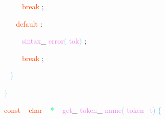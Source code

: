 \documentclass[8, usernames, dvipsnames]{beamer}
\begin{document}
\begin{frame}
\textcolor{White}{\   }
\textcolor{White}{\   }
\textcolor{White}{\   }
\textcolor{OrangeRed}{break}
\textcolor{Sepia}{;}

 \textcolor{White}{\   }
\textcolor{White}{\   }
\textcolor{OrangeRed}{default}
\textcolor{Sepia}{:}

 \textcolor{White}{\   }
\textcolor{White}{\   }
\textcolor{White}{\   }
\textcolor{Violet}{sintax}\textcolor{Sepia}{\_}
\textcolor{Violet}{error}\textcolor{SkyBlue}{(}
\textcolor{Violet}{tok}\textcolor{SkyBlue}{)}
\textcolor{Sepia}{;}

 \textcolor{White}{\   }
\textcolor{White}{\   }
\textcolor{White}{\   }
\textcolor{OrangeRed}{break}
\textcolor{Sepia}{;}

 
 
 \textcolor{White}{\   }
\textcolor{SkyBlue}{\} }

 \textcolor{SkyBlue}{\} }

 
 \textcolor{OrangeRed}{const}
\textcolor{White}{\ }
\textcolor{OrangeRed}{char}
\textcolor{White}{\ }
\textcolor{SpringGreen}{*}
\textcolor{White}{\ }
\textcolor{Violet}{get}\textcolor{Sepia}{\_}
\textcolor{Violet}{token}\textcolor{Sepia}{\_}
\textcolor{Violet}{name}\textcolor{SkyBlue}{(}
\textcolor{Violet}{token}\textcolor{White}{\ }
\textcolor{Violet}{t}\textcolor{SkyBlue}{)}
\textcolor{SkyBlue}{\{ }

 \end{frame}
\end{document}
